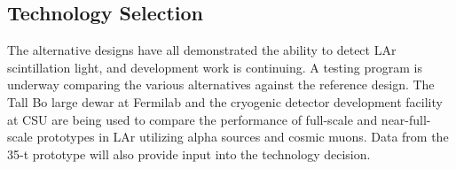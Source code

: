 \subsection{Technology Selection}

The alternative designs have all demonstrated the ability to detect
LAr scintillation light, and development work is continuing. A testing
program is underway comparing the various alternatives against the
reference design.  The Tall Bo large dewar at Fermilab and the
cryogenic detector development facility at CSU are being used to
compare the performance of full-scale and near-full-scale prototypes
in LAr utilizing alpha sources and cosmic muons. Data from the 35-t
prototype will also provide input into the technology decision. %
